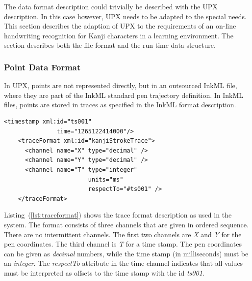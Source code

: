 The data format description could trivially be described with the UPX 
description. In this case however, UPX needs to be adapted to the special needs.
This section describes the adaption of UPX to the requirements of an on-line
handwriting recognition for Kanji characters in a learning environment.
The section describes both the file format and the run-time data structure.

\subsubsection{Point Data Format}
\label{sec:hwre:pointdataformat}

In UPX, points are not represented directly, but in an outsourced InkML file,
where they are part of the InkML standard pen trajectory definition. In InkML
files, points are stored in traces as specified in the InkML format description.
\begin{xmlcode}
  \begin{lstlisting}[emph={traceFormat,channel,timestamp},
                     emphstyle=\color{blue}\textbf,
                     emph={[2]name,type,units,respectTo,id,time},
                     emphstyle={[2]\color{red}},
                     caption={Definition of the trace format},
                     label=lst:traceformat]
    <timestamp xml:id="ts001" 
               time="1265122414000"/>
    <traceFormat xml:id="kanjiStrokeTrace">
      <channel name="X" type="decimal" />
      <channel name="Y" type="decimal" />
      <channel name="T" type="integer"
                        units="ms"
                        respectTo="#ts001" />
    </traceFormat>
  \end{lstlisting}
\end{xmlcode}
Listing~(\ref{lst:traceformat}) shows the trace format description as used in
the system. The format consists of three channels that are given in ordered 
sequence. There are no intermittent channels. The first two channels are \emph{X}
and \emph{Y} for the pen coordinates. The third channel is \emph{T} for a time 
stamp. The pen coordinates can be given as \emph{decimal} numbers, while the
time stamp (in milliseconds) must be an \emph{integer}.
The \emph{respectTo} attribute in the time channel indicates that all values
must be interpreted as offsets to the time stamp with the id \emph{ts001}.

